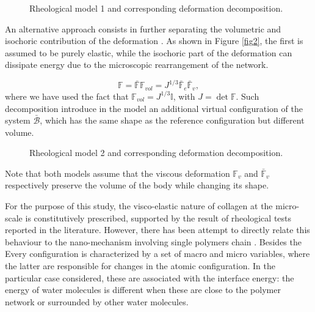 \documentclass[12pt]{extarticle}
\newcommand{\F}{\ensuremath{\mathbb{F}}}
\begin{document}
\begin{figure}[h!]
	\hspace{10mm}
\def\svgwidth{0.85\linewidth}

\caption{Rheological model 1 and corresponding deformation decomposition.}
\label{fig1}
\end{figure}

An alternative approach consists in further separating the volumetric and isochoric contribution of the deformation \cite{magneto,NGUYEN,Jeru}. As shown in Figure \ref{fig2}, the first is assumed to be purely elastic, while the isochoric part of the deformation can dissipate energy due to the microscopic rearrangement of the network. 

\begin{equation}
\F= \bar{\F} \F_{vol}= J^{1/3} \bar{\F}_e \bar{\F}_v,
\end{equation}
where we have used the fact that $\F_{vol}=J^{1/3}\mathbb{I}$, with $J=\det \F$. Such decomposition introduce in the model an additional virtual configuration of the system $\bar{\mathcal{B}}$, which has the same shape as the reference configuration but different volume. 

\begin{figure}[h!]
	\hspace{5mm}
	\def\svgwidth{1\linewidth}
	
	\caption{Rheological model 2 and corresponding deformation decomposition.}
	\label{Model2}
\end{figure}

Note that both models assume that the viscous deformation $\F_v$ and $\bar{\F}_v$ respectively preserve the volume of the body while changing its shape. 

For the purpose of this study, the visco-elastic nature of collagen at the micro-scale is constitutively prescribed, supported by the result of rheological tests reported in the literature. However, there has been attempt to directly relate this behaviour to the nano-mechanism involving single polymers chain \cite{BERGSTROM1998931}. Besides the
Every configuration is characterized by a set of macro and micro variables, where the latter are responsible for changes in the atomic configuration. In the particular case considered, these are associated with the interface energy: the energy of water molecules is different when these are close to the polymer network or surrounded by other water molecules. 
\end{document}
